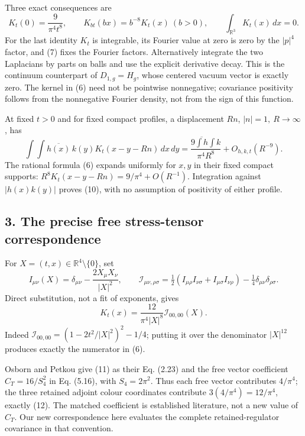 \documentclass[
  11pt,
]{article}
\begin{document}
Three exact consequences are \[
 K_t(0)=\frac9{\pi^4t^8},\qquad
 K_{bt}(bx)=b^{-8}K_t(x)\ (b>0),\qquad
 \int_{\mathbb R^3}K_t(x)\,dx=0 .
 \tag{9}
\] For the last identity \(K_t\) is integrable, its Fourier value at
zero is zero by the \(|p|^4\) factor, and (7) fixes the Fourier factors.
Alternatively integrate the two Laplacians by parts on balls and use the
explicit derivative decay. This is the continuum counterpart of
\(D_{1,g}=H_g\), whose centered vacuum vector is exactly zero. The
kernel in (6) need not be pointwise nonnegative; covariance positivity
follows from the nonnegative Fourier density, not from the sign of this
function.

At fixed \(t>0\) and for fixed compact profiles, a displacement \(Rn\),
\(|n|=1,\ R\to\infty\), has \[
 \int\!\!\int \overline{h(x)}\,k(y)
                   K_t(x-y-Rn)\,dx\,dy
 =\frac{9\overline{\int h}\int k}{\pi^4R^8}+O_{h,k,t}(R^{-9}).
 \tag{10}
\] The rational formula (6) expands uniformly for \(x,y\) in their fixed
compact supports: \(R^8K_t(x-y-Rn)=9/\pi^4+O(R^{-1})\). Integration
against \(|h(x)k(y)|\) proves (10), with no assumption of positivity of
either profile.

\subsection{3. The precise free stress-tensor
correspondence}\label{weak-coupling-part-11-the-precise-free-stress-tensor-correspondence}

For \(X=(t,x)\in\mathbb R^4\setminus\{0\}\), set \[
 I_{\mu\nu}(X)=\delta_{\mu\nu}
                     -\frac{2X_\mu X_\nu}{|X|^2},\qquad
 \mathcal I_{\mu\nu,\rho\sigma}
 =\tfrac12(I_{\mu\rho}I_{\nu\sigma}+I_{\mu\sigma}I_{\nu\rho})
                         -\tfrac14\delta_{\mu\nu}\delta_{\rho\sigma}.
 \tag{11}
\] Direct substitution, not a fit of exponents, gives \[
 \boxed{K_t(x)=
       \frac{12}{\pi^4|X|^8}\mathcal I_{00,00}(X).}
 \tag{12}
\] Indeed \(\mathcal I_{00,00}=(1-2t^2/|X|^2)^2-1/4\); putting it over
the denominator \(|X|^{12}\) produces exactly the numerator in (6).

Osborn and Petkou give (11) as their Eq. (2.23) and the free vector
coefficient \(C_T=16/S_4^2\) in Eq. (5.16), with \(S_4=2\pi^2\). Thus
each free vector contributes \(4/\pi^4\); the three retained adjoint
colour coordinates contribute \(3(4/\pi^4)=12/\pi^4\), exactly (12). The
matched coefficient is established literature, not a new value of
\(C_T\). Our new correspondence here evaluates the complete
retained-regulator covariance in that convention.
\end{document}
